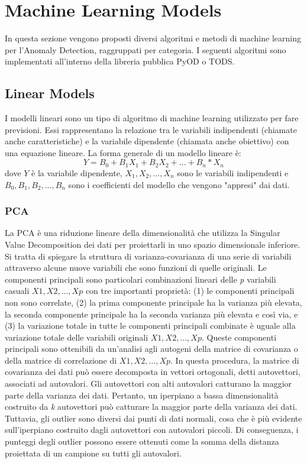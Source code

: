 \section{Machine Learning Models}
In questa sezione vengono proposti diversi algoritmi e metodi di machine learning per l'Anomaly Detection, raggruppati per categoria.
I seguenti algoritmi sono implementati all'interno della libreria pubblica PyOD o TODS.

\subsection{Linear Models}
I modelli lineari sono un tipo di algoritmo di machine learning utilizzato per fare previsioni. Essi rappresentano la relazione tra le variabili indipendenti (chiamate anche caratteristiche) e la variabile dipendente (chiamata anche obiettivo) con una equazione lineare. La forma generale di un modello lineare è: 
\[ Y = B_0 + B_1X_1 + B_2X_2 + ... + B_n*X_n\]
dove $ Y $ è la variabile dipendente,  \(X_1, X_2, ..., X_n\)  sono le variabili indipendenti e \( B_0, B_1, B_2, ..., B_n\) sono i coefficienti del modello che vengono "appresi" dai dati.

\subsubsection{PCA}
La PCA è una riduzione lineare della dimensionalità che utilizza la Singular Value Decomposition dei dati per proiettarli in uno spazio dimensionale inferiore. Si tratta di spiegare la struttura di varianza-covarianza di una serie di variabili attraverso alcune nuove variabili che sono funzioni di quelle originali. Le componenti principali sono particolari combinazioni lineari delle \textit{p} variabili casuali  \(X1, X2, ..., Xp\) con tre importanti proprietà: (1) le componenti principali non sono correlate, (2) la prima componente principale ha la varianza più elevata, la seconda componente principale ha la seconda varianza più elevata e così via, e (3) la variazione totale in tutte le componenti principali combinate è uguale alla variazione totale delle variabili originali \(X1, X2, ..., Xp\). 
Queste componenti principali sono ottenibili da un'analisi agli autogeni della matrice di covarianza o della matrice di correlazione di \(X1, X2, ..., Xp\).
In questa procedura, la matrice di covarianza dei dati può essere decomposta in vettori ortogonali, detti autovettori, associati ad autovalori. Gli autovettori con alti autovalori catturano la maggior parte della varianza dei dati. Pertanto, un iperpiano a bassa dimensionalità costruito da \textit{k} autovettori può catturare la maggior parte della varianza dei dati. Tuttavia, gli outlier sono diversi dai punti di dati normali, cosa che è più evidente sull'iperpiano costruito dagli autovettori con autovalori piccoli.
Di conseguenza, i punteggi degli outlier possono essere ottenuti come la somma della distanza proiettata di un campione su tutti gli autovalori.


